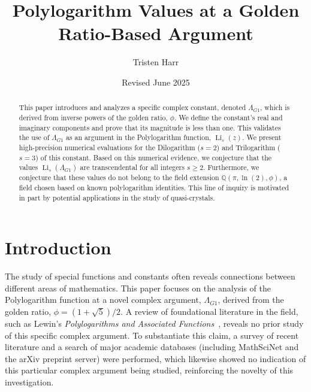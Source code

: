\documentclass{amsart}
\theoremstyle{plain}
\theoremstyle{definition}
\theoremstyle{remark}
\DeclareMathOperator{\Li}{Li} %
\newcommand{\LambdaG}{\Lambda_{G1}}
\newcommand{\phiG}{\phi}
\begin{document}
\title[Polylogarithms at a Golden Ratio Argument]{Polylogarithm Values at a Golden Ratio-Based Argument}
\author{Tristen Harr}
\date{Revised June 2025}

\begin{abstract}
This paper introduces and analyzes a specific complex constant, denoted $\LambdaG$, which is derived from inverse powers of the golden ratio, $\phiG$. We define the constant's real and imaginary components and prove that its magnitude is less than one. This validates the use of $\LambdaG$ as an argument in the Polylogarithm function, $\Li_s(z)$. We present high-precision numerical evaluations for the Dilogarithm ($s=2$) and Trilogarithm ($s=3$) of this constant. Based on this numerical evidence, we conjecture that the values $\Li_s(\LambdaG)$ are transcendental for all integers $s \ge 2$. Furthermore, we conjecture that these values do not belong to the field extension $\mathbb{Q}(\pi, \ln(2), \phiG)$, a field chosen based on known polylogarithm identities. This line of inquiry is motivated in part by potential applications in the study of quasi-crystals.
\end{abstract}

\maketitle

\section{Introduction}
The study of special functions and constants often reveals connections between different areas of mathematics. This paper focuses on the analysis of the Polylogarithm function at a novel complex argument, $\LambdaG$, derived from the golden ratio, $\phiG = (1+\sqrt{5})/2$. A review of foundational literature in the field, such as Lewin's \textit{Polylogarithms and Associated Functions}~\cite{Lewin}, reveals no prior study of this specific complex argument. To substantiate this claim, a survey of recent literature and a search of major academic databases (including MathSciNet and the arXiv preprint server) were performed, which likewise showed no indication of this particular complex argument being studied, reinforcing the novelty of this investigation.
\end{document}

